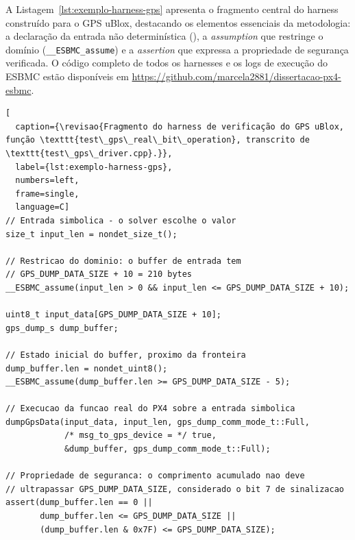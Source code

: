 
A Listagem~\ref{lst:exemplo-harness-gps} apresenta o fragmento central do harness construído para o GPS uBlox, destacando os elementos essenciais da metodologia: a declaração da entrada não determinística (), a \textit{assumption} que restringe o domínio (\texttt{\_\_ESBMC\_assume}) e a \textit{assertion} que expressa a propriedade de segurança verificada. O código completo de todos os harnesses e os logs de execução do ESBMC estão disponíveis em \url{https://github.com/marcela2881/dissertacao-px4-esbmc}.

\begin{lstlisting}[
  caption={\revisao{Fragmento do harness de verificação do GPS uBlox, função \texttt{test\_gps\_real\_bit\_operation}, transcrito de \texttt{test\_gps\_driver.cpp}.}},
  label={lst:exemplo-harness-gps},
  numbers=left,
  frame=single,
  language=C]
// Entrada simbolica - o solver escolhe o valor
size_t input_len = nondet_size_t();

// Restricao do dominio: o buffer de entrada tem
// GPS_DUMP_DATA_SIZE + 10 = 210 bytes
__ESBMC_assume(input_len > 0 && input_len <= GPS_DUMP_DATA_SIZE + 10);

uint8_t input_data[GPS_DUMP_DATA_SIZE + 10];
gps_dump_s dump_buffer;

// Estado inicial do buffer, proximo da fronteira
dump_buffer.len = nondet_uint8();
__ESBMC_assume(dump_buffer.len >= GPS_DUMP_DATA_SIZE - 5);

// Execucao da funcao real do PX4 sobre a entrada simbolica
dumpGpsData(input_data, input_len, gps_dump_comm_mode_t::Full,
            /* msg_to_gps_device = */ true,
            &dump_buffer, gps_dump_comm_mode_t::Full);

// Propriedade de seguranca: o comprimento acumulado nao deve
// ultrapassar GPS_DUMP_DATA_SIZE, considerado o bit 7 de sinalizacao
assert(dump_buffer.len == 0 ||
       dump_buffer.len <= GPS_DUMP_DATA_SIZE ||
       (dump_buffer.len & 0x7F) <= GPS_DUMP_DATA_SIZE);
\end{lstlisting}


